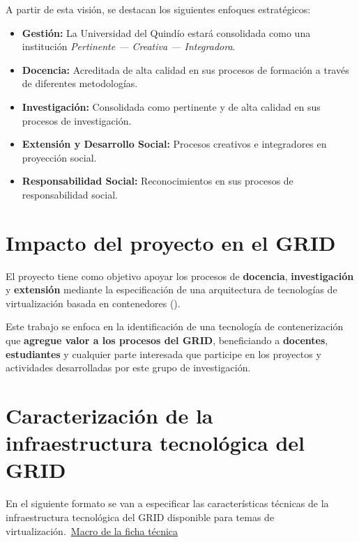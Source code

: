 A partir de esta visión, se destacan los siguientes enfoques estratégicos:

\begin{itemize}
    \item \textbf{Gestión:} La Universidad del Quindío estará consolidada como una institución \textit{Pertinente --- Creativa --- Integradora}.

    \item \textbf{Docencia:} Acreditada de alta calidad en sus procesos de formación a través de diferentes metodologías.

    \item \textbf{Investigación:} Consolidada como pertinente y de alta calidad en sus procesos de investigación.

    \item \textbf{Extensión y Desarrollo Social:} Procesos creativos e integradores en proyección social.

    \item \textbf{Responsabilidad Social:} Reconocimientos en sus procesos de responsabilidad social.
\end{itemize}

\section{Impacto del proyecto en el GRID}

El proyecto tiene como objetivo apoyar los procesos de \textbf{docencia}, \textbf{investigación} 
y \textbf{extensión} mediante la especificación de una arquitectura de tecnologías de 
virtualización basada en contenedores (\VBC). 

Este trabajo se enfoca en la identificación de una tecnología de contenerización que 
\textbf{agregue valor a los procesos del GRID}, beneficiando a \textbf{docentes}, \textbf{estudiantes} 
y cualquier parte interesada que participe en los proyectos y actividades desarrolladas 
por este grupo de investigación.

\section{Caracterización de la infraestructura tecnológica del GRID}
En el siguiente formato se van a especificar las características técnicas de la infraestructura tecnológica del GRID disponible para temas de virtualización.\ \href{https://docs.google.com/spreadsheets/d/14NBv72ucVTrLqGIldYdIsjdBGt3QlgwcblcVRis-DaQ/edit?usp=sharing}{Macro de la ficha técnica}


